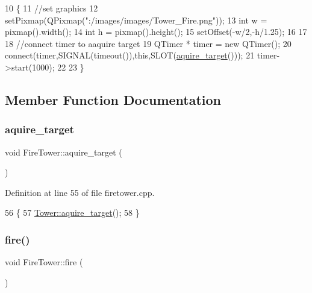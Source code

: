 \begin{DoxyCode}
10 \{
11     \textcolor{comment}{//set graphics}
12     setPixmap(QPixmap(\textcolor{stringliteral}{":/images/images/Tower\_Fire.png"}));
13     \textcolor{keywordtype}{int} w = pixmap().width();
14     \textcolor{keywordtype}{int} h = pixmap().height();
15     setOffset(-w/2,-h/1.25);
16 
17 
18     \textcolor{comment}{//connect timer to aaquire target}
19     QTimer * timer = \textcolor{keyword}{new} QTimer();
20     connect(timer,SIGNAL(timeout()),\textcolor{keyword}{this},SLOT(\hyperlink{class_fire_tower_a4a3c1e246ed66479aabff4ab5d187636}{aquire\_target}()));
21     timer->start(1000);
22 
23 \}
\end{DoxyCode}


\subsection{Member Function Documentation}
\mbox{\label{class_fire_tower_a4a3c1e246ed66479aabff4ab5d187636}} 
\subsubsection{\texorpdfstring{aquire\+\_\+target}{aquire\_target}}
{\footnotesize\ttfamily void Fire\+Tower\+::aquire\+\_\+target (\begin{DoxyParamCaption}{ }\end{DoxyParamCaption})\hspace{0.3cm}{\ttfamily [slot]}}



Definition at line 55 of file firetower.\+cpp.


\begin{DoxyCode}
56 \{
57     \hyperlink{class_tower_a6e0df1e43e746622967918aaf6f42dce}{Tower::aquire\_target}();
58 \}
\end{DoxyCode}
\mbox{\label{class_fire_tower_a9a0b13fcb0bc204194d953c5494afbe3}} 
\subsubsection{\texorpdfstring{fire()}{fire()}}
{\footnotesize\ttfamily void Fire\+Tower\+::fire (\begin{DoxyParamCaption}{ }\end{DoxyParamCaption})\hspace{0.3cm}{\ttfamily [virtual]}}



